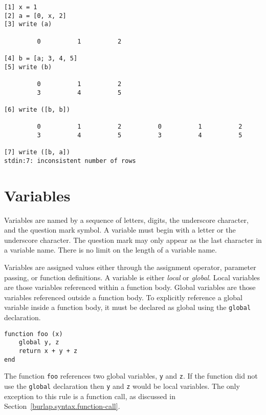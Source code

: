 \begin{screen}
\begin{verbatim}
[1] x = 1
[2] a = [0, x, 2]
[3] write (a)

         0          1          2 

[4] b = [a; 3, 4, 5]  
[5] write (b)

         0          1          2 
         3          4          5 

[6] write ([b, b])

         0          1          2          0          1          2 
         3          4          5          3          4          5 

[7] write ([b, a])
stdin:7: inconsistent number of rows
\end{verbatim}
\end{screen}


\section{Variables}
\label{burlap.syntax.variables}

Variables are named by a sequence of letters, digits, the underscore
character, and the question mark symbol.  A variable must begin with a
letter or the underscore character.  The question mark may only appear
as the last character in a variable name.  There is no limit on the
length of a variable name.

Variables are assigned values either through the assignment operator,
parameter passing, or function definitions.  A variable is either {\em
local} or {\em global}.  Local variables are those variables
referenced within a function body.  Global variables are those
variables referenced outside a function body.  To explicitly reference
a global variable inside a function body, it must be declared as
global using the {\tt global} declaration.

\begin{screen}
\begin{verbatim}
function foo (x)
    global y, z
    return x + y + z
end
\end{verbatim}
\end{screen}

The function {\tt foo} references two global variables, {\tt y} and
{\tt z}.  If the function did not use the {\tt global} declaration
then {\tt y} and {\tt z} would be local variables.  The only
exception to this rule is a function call, as discussed in
Section~\ref{burlap.syntax.function-call}.


